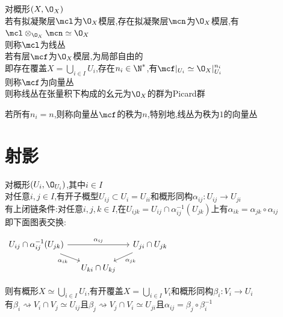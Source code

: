 \begin{dingyi}
对概形$(X,\O_{X})$\\
若有拟凝聚层$\mcl$为$\O_{X}$模层,存在拟凝聚层$\mcn$为$\O_{X}$模层,有$\mcl\otimes_{\O_{X}}\mcn\simeq\O_{X}$\\
则称$\mcl$为线丛\\
若有层$\mcf$为$\O_{X}$模层,为局部自由的\\
即存在覆盖$X=\bigcup\limits_{i\in I}U_i$,存在$n_i\in \N^*$,有$\mcf|_{U_i}\simeq\O_{X}|_{U_i}^{n_i}$\\
则称$\mcf$为向量丛\\
则称线丛在张量积下构成的幺元为$\O_{X}$的群为Picard群
\end{dingyi}

\begin{zhu}
若所有$n_i=n$,则称向量丛$\mcf$的秩为$n$,特别地,线丛为秩为$1$的向量丛
\end{zhu}

\chapter{射影}

\begin{dingli}
对概形$(U_i,\O_{U_i})$,其中$i\in I$\\
对任意$i,j\in I$,有开子概型$U_{ij}\subset U_{i}=U_{ii}$和概形同构$\alpha_{ij}:U_{ij}\to U_{ji}$\\
有上闭链条件:对任意$i,j,k\in I$,在$U_{ijk}=U_{ij}\cap \alpha_{ij}^{-1}(U_{jk})$上有$\alpha_{ik}=\alpha_{jk}\circ\alpha_{ij}$\\
即下面图表交换:
\begin{center}
    $\begin{tikzcd}[column sep=small, row sep=small]
    U_{ij}\cap \alpha_{ij}^{-1}(U_{jk}) \ar[rr,"\alpha_{ij}"] \ar[dr,"\alpha_{ik}"'] & & U_{ji}\cap U_{jk} \ar[dl,"\alpha_{jk}"]\\
    & U_{ki}\cap U_{kj} & 
    \end{tikzcd}$
\end{center}
则有概形$X\simeq\bigcup\limits_{i\in I}U_i$,有开覆盖$X=\bigcup\limits_{i\in I}V_i$和概形同构$\beta_{i}:V_i\to U_i$\\
有$\beta_i\rightsquigarrow V_i\cap V_j \simeq U_{ij}$且$\beta_j\rightsquigarrow V_j\cap V_i\simeq U_{ji}$且$\alpha_{ij}=\beta_{j}\circ\beta_{i}^{-1}$
\end{dingli}

